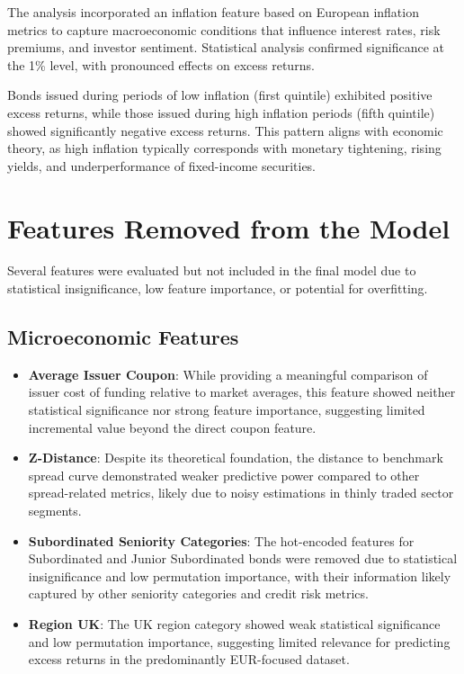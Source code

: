 The analysis incorporated an inflation feature based on European inflation metrics to capture macroeconomic conditions that influence interest rates, risk premiums, and investor sentiment. Statistical analysis confirmed significance at the 1\% level, with pronounced effects on excess returns.

Bonds issued during periods of low inflation (first quintile) exhibited positive excess returns, while those issued during high inflation periods (fifth quintile) showed significantly negative excess returns. This pattern aligns with economic theory, as high inflation typically corresponds with monetary tightening, rising yields, and underperformance of fixed-income securities.

\section{Features Removed from the Model}

Several features were evaluated but not included in the final model due to statistical insignificance, low feature importance, or potential for overfitting.

\subsection{Microeconomic Features}

\begin{itemize}
    \item \textbf{Average Issuer Coupon}: While providing a meaningful comparison of issuer cost of funding relative to market averages, this feature showed neither statistical significance nor strong feature importance, suggesting limited incremental value beyond the direct coupon feature.
    \item \textbf{Z-Distance}: Despite its theoretical foundation, the distance to benchmark spread curve demonstrated weaker predictive power compared to other spread-related metrics, likely due to noisy estimations in thinly traded sector segments.
    \item \textbf{Subordinated Seniority Categories}: The hot-encoded features for Subordinated and Junior Subordinated bonds were removed due to statistical insignificance and low permutation importance, with their information likely captured by other seniority categories and credit risk metrics.
    \item \textbf{Region UK}: The UK region category showed weak statistical significance and low permutation importance, suggesting limited relevance for predicting excess returns in the predominantly EUR-focused dataset.
\end{itemize}

